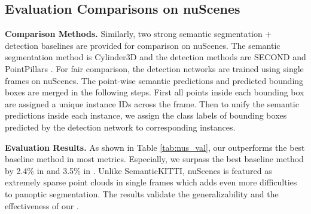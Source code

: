 \documentclass[final]{cvpr}
\begin{document}
 \subsection{Evaluation Comparisons on nuScenes}

\noindent\textbf{Comparison Methods.}
Similarly, two strong semantic segmentation + detection baselines are provided for comparison on nuScenes.
The semantic segmentation method is Cylinder3D \cite{zhou2020cylinder3d} and the detection
methods are SECOND \cite{yan2018second} and PointPillars \cite{lang2019pointpillars}.
For fair comparison, the detection networks are trained using single frames on nuScenes.
The point-wise semantic predictions and predicted bounding boxes are merged in the following steps.
First all points inside each bounding box are assigned a unique instance IDs across the frame.
Then to unify the semantic predictions inside each instance, we assign the class labels of bounding
boxes predicted by the detection network to corresponding instances.

\noindent\textbf{Evaluation Results.}
As shown in Table \ref{tab:nus_val}, our \nickname{} outperforms the best baseline method in most metrics.
Especially, we surpass the best baseline method by 2.4\% in \PQ{} and 3.5\% in \PQth{}.
Unlike SemanticKITTI, nuScenes is featured as extremely sparse point clouds in single frames which
adds even more difficulties to panoptic segmentation.
The results validate the generalizability and the effectiveness of our \nickname{}.
\end{document}
